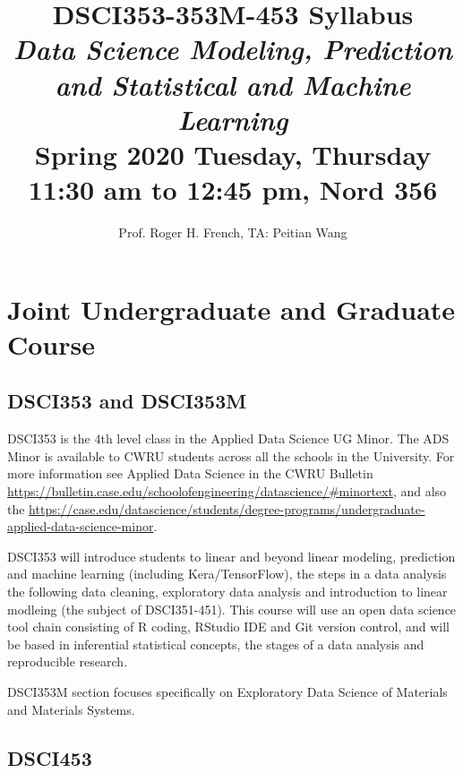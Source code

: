 \documentclass[11pt]{article} %
\title{DSCI353-353M-453 Syllabus \\ \emph{Data Science Modeling, Prediction and Statistical and Machine Learning} \\ Spring 2020 	Tuesday, Thursday 11:30 am to 12:45 pm, 	Nord 356}
\author{Prof. Roger H. French, TA: Peitian Wang}
\begin{document}
\maketitle


\section{Joint Undergraduate and Graduate Course}

  \subsection{DSCI353 and DSCI353M}
  
    DSCI353 is the 4th level class in the Applied Data Science UG Minor. 
    The ADS Minor is available to CWRU students across all the schools in the University. 
    For more information see Applied Data Science in the CWRU Bulletin \href{''https://bulletin.case.edu/schoolofengineering/datascience/\#minortext''}{https://bulletin.case.edu/schoolofengineering/datascience/\#minortext}, and also the \href{''https://case.edu/datascience/students/degree-programs/undergraduate-applied-data-science-minor''}{https://case.edu/datascience/students/degree-programs/undergraduate-applied-data-science-minor}.  
    
    DSCI353 will introduce students to linear and beyond linear modeling, prediction and machine learning (including Kera/TensorFlow), the steps in a data analysis the following data cleaning, exploratory data analysis and introduction to linear modleing (the subject of DSCI351-451). 
    This course will use an open data science tool chain consisting of R coding, RStudio IDE and Git version control, and will be based in inferential statistical concepts, the stages of a data analysis and reproducible research. 
    
    DSCI353M section focuses specifically on Exploratory Data Science of Materials and Materials Systems. 
  
  \subsection{DSCI453}
  
\end{document}
